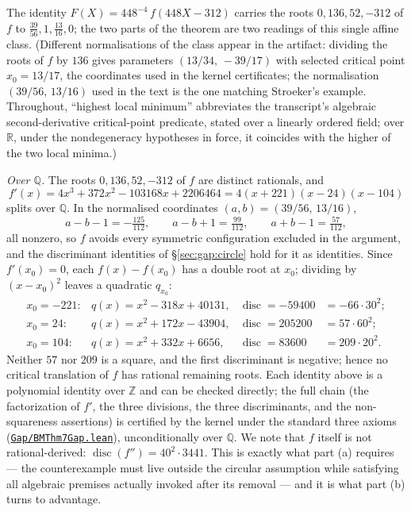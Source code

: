 \documentclass[11pt]{amsart}
\newcommand{\Q}{\mathbb{Q}}
\newcommand{\Z}{\mathbb{Z}}
\newcommand{\R}{\mathbb{R}}
\newcommand{\repourl}{https://github.com/hirokifukui/rd-quartics-classification}
\newcommand{\repotag}{v1.1.0}
\newcommand{\leanfile}[1]{\href{\repourl/blob/\repotag/#1}{\texttt{#1}}}
\begin{document}
The identity
$F(X)=448^{-4}\,f(448X-312)$
carries the roots $0,136,52,-312$ of $f$ to
$\tfrac{39}{56},1,\tfrac{13}{16},0$; the two parts of the theorem are
two readings of this single affine class.  (Different normalisations of
the class appear in the artifact: dividing the roots of $f$ by $136$
gives parameters $(13/34,\,-39/17)$ with selected critical point
$x_0=13/17$, the coordinates used in the kernel certificates; the
normalisation $(39/56,\,13/16)$ used in the text is the one matching
Stroeker's example.  Throughout, ``highest local minimum'' abbreviates
the transcript's algebraic second-derivative critical-point predicate,
stated over a linearly ordered field; over $\R$, under the
nondegeneracy hypotheses in force, it coincides with the higher of the
two local minima.)

\emph{Over $\Q$.}  The roots $0,136,52,-312$ of $f$ are distinct
rationals, and
\[
f'(x)=4x^3+372x^2-103168x+2206464=4(x+221)(x-24)(x-104)
\]
splits over $\Q$.  In the normalised coordinates $(a,b)=(39/56,\,13/16)$,
\[
a-b-1=-\tfrac{125}{112},\qquad a-b+1=\tfrac{99}{112},\qquad
a+b-1=\tfrac{57}{112},
\]
all nonzero, so $f$ avoids every symmetric configuration excluded in
the argument, and the discriminant identities of
\S\ref{sec:gap:circle} hold for it as identities.  Since $f'(x_0)=0$,
each $f(x)-f(x_0)$ has a double root at $x_0$; dividing by $(x-x_0)^2$
leaves a quadratic $q_{x_0}$:
\[
\begin{array}{llll}
x_0=-221: & q(x)=x^2-318x+40131, & \operatorname{disc}=-59400&=-66\cdot 30^2;\\[2pt]
x_0=24: & q(x)=x^2+172x-43904, & \operatorname{disc}=205200&=57\cdot 60^2;\\[2pt]
x_0=104: & q(x)=x^2+332x+6656, & \operatorname{disc}=83600&=209\cdot 20^2.
\end{array}
\]
Neither $57$ nor $209$ is a square, and the first discriminant is
negative; hence no critical translation of $f$ has rational remaining
roots.  Each identity above is a polynomial identity over $\Z$ and can
be checked directly; the full chain (the factorization of $f'$, the
three divisions, the three discriminants, and the non-squareness
assertions) is certified by the kernel under the standard three axioms
(\leanfile{Gap/BMThm7Gap.lean}), unconditionally over $\Q$.  We note
that $f$ itself is not rational-derived:
$\operatorname{disc}(f'')=40^2\cdot 3441$.  This is exactly what part
(a) requires --- the counterexample must live outside the circular
assumption while satisfying all algebraic premises actually invoked
after its removal --- and it is what part (b) turns to advantage.
\end{document}
